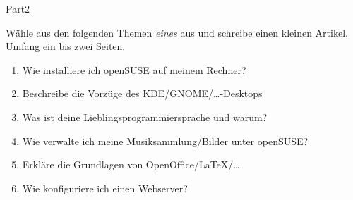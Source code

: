 \documentclass[a4paper,twoside]{article}
\begin{document}
\begin{exam}[Teil 2.]{Part2}
\begin{instructions}[Hausaufgaben]
Wähle aus den folgenden Themen \emph{eines} aus und schreibe einen kleinen
Artikel. Umfang ein bis zwei Seiten.
\end{instructions}

\begin{enumerate}
 \item Wie installiere ich openSUSE auf meinem Rechner?
 \item Beschreibe die Vorzüge des KDE/GNOME/\ldots-Desktops
 \item Was ist deine Lieblingsprogrammiersprache und warum?
 \item Wie verwalte ich meine Musiksammlung/Bilder unter openSUSE?
 \item Erkläre die Grundlagen von OpenOffice/\LaTeX/\ldots
 \item Wie konfiguriere ich einen Webserver?
\end{enumerate}

\end{exam}
\end{document}
